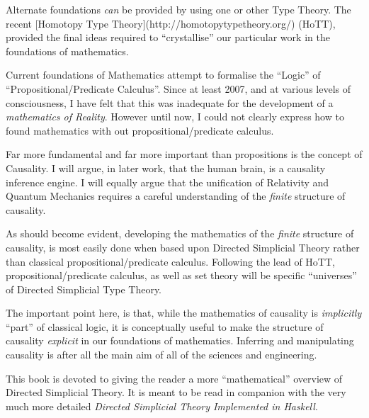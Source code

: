 \documentclass[a4paper,openany]{amsbook}
\begin{document}
Alternate foundations \emph{can} be provided by using one or other Type Theory.
The recent [Homotopy Type Theory](http://homotopytypetheory.org/) (HoTT),
provided the final ideas required to ``crystallise'' our particular work in the
foundations of mathematics.

Current foundations of Mathematics attempt to formalise the ``Logic'' of
``Propositional/Predicate Calculus''.  Since at least 2007, and at various
levels of consciousness, I have felt that this was inadequate for the
development of a \textit{mathematics of Reality}.  However until now, I could
not clearly express how to found mathematics with out propositional/predicate
calculus.

Far more fundamental and far more important than propositions is the concept of
Causality.  I will argue, in later work, that the human brain, is a causality
inference engine. I will equally argue that the unification of Relativity and
Quantum Mechanics requires a careful understanding of the \emph{finite}
structure of causality.

As should become evident, developing the mathematics of the \emph{finite}
structure of causality, is most easily done when based upon Directed Simplicial
Theory rather than classical propositional/predicate calculus. Following the
lead of HoTT, propositional/predicate calculus, as well as set theory will be
specific ``universes'' of Directed Simplicial Type Theory.

The important point here, is that, while the mathematics of causality is
\emph{implicitly} ``part'' of classical logic, it is conceptually useful to make
the structure of causality \emph{explicit} in our foundations of mathematics. 
Inferring and manipulating causality is after all the main aim of all of the
sciences and engineering.

This book is devoted to giving the reader a more ``mathematical'' overview of
Directed Simplicial Theory.  It is meant to be read in companion with the very
much more detailed \textit{Directed Simplicial Theory Implemented in Haskell}.



\end{document}
